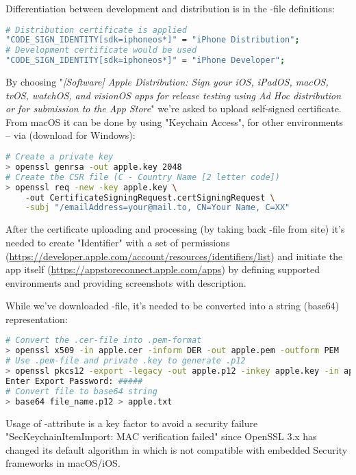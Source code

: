 Differentiation between development and distribution is in the -file definitions:

\begin{lstlisting}[language=bash]
# Distribution certificate is applied
"CODE_SIGN_IDENTITY[sdk=iphoneos*]" = "iPhone Distribution";
# Development certificate would be used
"CODE_SIGN_IDENTITY[sdk=iphoneos*]" = "iPhone Developer";
\end{lstlisting}

By choosing "\emph{[Software] Apple Distribution: Sign your iOS, iPadOS, macOS, tvOS, watchOS, and visionOS apps for 
release testing using Ad Hoc distribution or for submission to the App Store}" we're asked to upload self-signed 
certificate. From macOS it can be done by using "Keychain Access", for other environments -- via  (download 
 for Windows):

\begin{lstlisting}[language=bash]
# Create a private key
> openssl genrsa -out apple.key 2048
# Create the CSR file (C - Country Name [2 letter code])
> openssl req -new -key apple.key \ 
    -out CertificateSigningRequest.certSigningRequest \
    -subj "/emailAddress=your@mail.to, CN=Your Name, C=XX"
\end{lstlisting}

After the certificate uploading and processing (by taking back -file from site) it's needed to create 
"Identifier" with a set of permissions 
(\href{https://developer.apple.com/account/resources/identifiers/list}{https://developer.apple.com/account/resources/identifiers/list})
and initiate the app itself 
(\href{https://appstoreconnect.apple.com/apps}{https://appstoreconnect.apple.com/apps}) by defining supported 
environments and providing screenshots with description.

While we've downloaded -file, it's needed to be converted into a string (base64) representation:

\begin{lstlisting}[language=bash]
# Convert the .cer-file into .pem-format
> openssl x509 -in apple.cer -inform DER -out apple.pem -outform PEM
# Use .pem-file and private .key to generate .p12
> openssl pkcs12 -export -legacy -out apple.p12 -inkey apple.key -in apple.pem
Enter Export Password: #####
# Convert file to base64 string
> base64 file_name.p12 > apple.txt
\end{lstlisting}

\noindent Usage of -attribute is a key factor to avoid a security failure "SecKeychainItemImport: MAC 
verification failed" since OpenSSL 3.x has changed its default algorithm in  which is not compatible with 
embedded Security frameworks in macOS/iOS.

